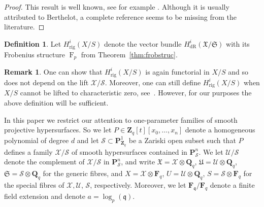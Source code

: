 \documentclass[a4paper,11pt]{article}
\numberwithin{equation}{section}
\newcommand{\ZZ}{\mathbf{Z}} %
\newcommand{\QQ}{\mathbf{Q}} %
\newcommand{\FF}{\mathbf{F}} %
\DeclareMathOperator{\Frob}{F}           %
\providecommand{\HdR}{H_{\text{dR}}}    %
\providecommand{\Hrig}{H_{\text{rig}}}  %
\theoremstyle{definition}
\newtheorem{defn}[thm]{Definition}
\newtheorem{rem}[thm]{Remark}
\begin{document}
\begin{proof}
This result is well known, see for example \citep[Theorem 6.1.3]{Kedlaya2012}.
Although it is usually attributed to Berthelot, a complete reference 
seems to be missing from the literature.
\end{proof}

\begin{defn}
Let $\Hrig^i(X/S)$ denote the vector bundle $\HdR^i(\mathfrak{X}/\mathfrak{S})$ 
with its Frobenius structure $\Frob_p$ from Theorem~\ref{thm:frobstruc}.
\end{defn}

\begin{rem}
One can show that $\Hrig^i(X/S)$ is again functorial in $X/S$ and so does 
not depend on the lift $\mathcal{X}/\mathcal{S}$. Moreover, one can still 
define $\Hrig^i(X/S)$ when $X/S$ cannot be lifted to characteristic zero, 
see~\citep{Berthelot1986}.  However, for our purposes the above definition 
will be sufficient.
\end{rem}

In this paper we restrict our attention to one-parameter families of smooth 
projective hypersurfaces. So we let $P \in \ZZ_q[t][x_0,\dotsc,x_n]$ denote 
a homogeneous polynomial of degree $d$ and let 
$\mathcal{S} \subset \mathbf{P}^1_{\ZZ_q}$ be a Zariski open subset such that 
$P$ defines a family $\mathcal{X}/\mathcal{S}$ of smooth hypersurfaces contained 
in $\mathbf{P}^n_{\mathcal{S}}$. 
We let $\mathcal{U}/\mathcal{S}$ 
denote the complement of $\mathcal{X}/\mathcal{S}$ in $\mathbf{P}^n_{\mathcal{S}}$,
and write $\mathfrak{X}=\mathcal{X} \otimes \QQ_q$, 
$\mathfrak{U}=\mathcal{U} \otimes \QQ_q$, $\mathfrak{S}=\mathcal{S} \otimes \QQ_q$
for the generic fibres, and $X=\mathcal{X} \otimes \FF_q$, 
$U=\mathcal{U} \otimes \QQ_q$, $S=\mathcal{S} \otimes \FF_q$ for the special 
fibres of $\mathcal{X},\mathcal{U}$, $\mathcal{S}$, respectively. Moreover, 
we let $\FF_{\mathfrak{q}}/\FF_q$ denote a finite field extension and 
denote $a=\log_p(\mathfrak{q})$.
\end{document}
